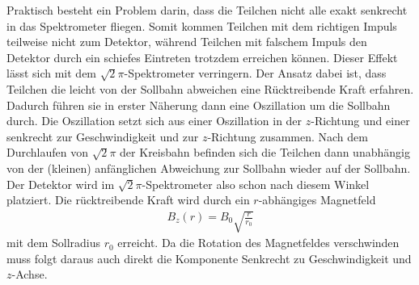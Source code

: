 Praktisch besteht ein Problem darin, dass die Teilchen nicht alle exakt senkrecht in das Spektrometer fliegen. Somit kommen Teilchen mit dem richtigen Impuls teilweise nicht zum Detektor, während Teilchen mit falschem Impuls den Detektor durch ein schiefes Eintreten trotzdem erreichen können. Dieser Effekt lässt sich mit dem $\sqrt{2}\pi$-Spektrometer verringern. Der Ansatz dabei ist, dass Teilchen die leicht von der Sollbahn abweichen eine Rücktreibende Kraft erfahren. Dadurch führen sie in erster Näherung dann eine Oszillation um die Sollbahn durch. Die Oszillation setzt sich aus einer Oszillation in der $z$-Richtung und einer senkrecht zur Geschwindigkeit und zur $z$-Richtung zusammen. Nach dem Durchlaufen von $\sqrt{2}\pi$ der Kreisbahn befinden sich die Teilchen dann unabhängig von der (kleinen) anfänglichen Abweichung zur Sollbahn wieder auf der Sollbahn. Der Detektor wird im $\sqrt{2}\pi$-Spektrometer also schon nach diesem Winkel platziert. Die rücktreibende Kraft wird durch ein $r$-abhängiges Magnetfeld 
\begin{align*}
  B_z(r)=B_0\sqrt{\frac{r}{r_0}}
\end{align*}
mit dem Sollradius $r_0$ erreicht. Da die Rotation des Magnetfeldes verschwinden muss folgt daraus auch direkt die Komponente Senkrecht zu Geschwindigkeit und $z$-Achse.
